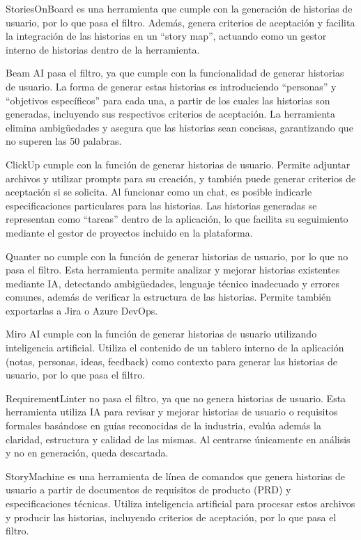 StoriesOnBoard \cite{storiesonboard} es una herramienta que cumple con la generación de historias de usuario, por lo que pasa el filtro. Además, genera criterios de aceptación y facilita la integración de las historias en un “story map”, actuando como un gestor interno de historias dentro de la herramienta.

Beam AI \cite{beamai} pasa el filtro, ya que cumple con la funcionalidad de generar historias de usuario. La forma de generar estas historias es introduciendo “personas” y “objetivos específicos” para cada una, a partir de los cuales las historias son generadas, incluyendo sus respectivos criterios de aceptación. La herramienta elimina ambigüedades y asegura que las historias sean concisas, garantizando que no superen las 50 palabras.

ClickUp \cite{clickup} cumple con la función de generar historias de usuario. Permite adjuntar archivos y utilizar prompts para su creación, y también puede generar criterios de aceptación si se solicita. Al funcionar como un chat, es posible indicarle especificaciones particulares para las historias. Las historias generadas se representan como “tareas” dentro de la aplicación, lo que facilita su seguimiento mediante el gestor de proyectos incluido en la plataforma.

Quanter \cite{quanter} no cumple con la función de generar historias de usuario, por lo que no pasa el filtro. Esta herramienta permite analizar y mejorar historias existentes mediante IA, detectando ambigüedades, lenguaje técnico inadecuado y errores comunes, además de verificar la estructura de las historias. Permite también exportarlas a Jira o Azure DevOps.

Miro AI \cite{miroai} cumple con la función de generar historias de usuario utilizando inteligencia artificial. Utiliza el contenido de un tablero interno de la aplicación (notas, personas, ideas, feedback) como contexto para generar las historias de usuario, por lo que pasa el filtro.

RequirementLinter \cite{requirementlinter} no pasa el filtro, ya que no genera historias de usuario. Esta herramienta utiliza IA para revisar y mejorar historias de usuario o requisitos formales basándose en guías reconocidas de la industria, evalúa además la claridad, estructura y calidad de las mismas. Al centrarse únicamente en análisis y no en generación, queda descartada.

StoryMachine \cite{storymachine} es una herramienta de línea de comandos que genera historias de usuario a partir de documentos de requisitos de producto (PRD) y especificaciones técnicas. Utiliza inteligencia artificial para procesar estos archivos y producir las historias, incluyendo criterios de aceptación, por lo que pasa el filtro.

